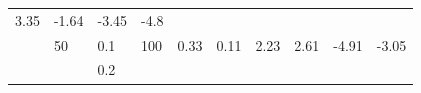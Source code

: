 \documentclass[12pt,oneside,a4paper]{reedthesis}
\begin{document}
\begin{longtable}[]{@{}llllllllll@{}}
\begin{minipage}[t]{0.07\columnwidth}
3.35\strut
\end{minipage} & \begin{minipage}[t]{0.07\columnwidth}\raggedright
-1.64\strut
\end{minipage} & \begin{minipage}[t]{0.09\columnwidth}\raggedright
-3.45\strut
\end{minipage} & \begin{minipage}[t]{0.09\columnwidth}\raggedright
-4.8\strut
\end{minipage}\tabularnewline
\begin{minipage}[t]{0.11\columnwidth}\raggedright
\strut
\end{minipage} & \begin{minipage}[t]{0.05\columnwidth}\raggedright
50\strut
\end{minipage} & \begin{minipage}[t]{0.05\columnwidth}\raggedright
0.1\strut
\end{minipage} & \begin{minipage}[t]{0.05\columnwidth}\raggedright
100\strut
\end{minipage} & \begin{minipage}[t]{0.07\columnwidth}\raggedright
0.33\strut
\end{minipage} & \begin{minipage}[t]{0.07\columnwidth}\raggedright
0.11\strut
\end{minipage} & \begin{minipage}[t]{0.07\columnwidth}\raggedright
2.23\strut
\end{minipage} & \begin{minipage}[t]{0.07\columnwidth}\raggedright
2.61\strut
\end{minipage} & \begin{minipage}[t]{0.09\columnwidth}\raggedright
-4.91\strut
\end{minipage} & \begin{minipage}[t]{0.09\columnwidth}\raggedright
-3.05\strut
\end{minipage}\tabularnewline
\begin{minipage}[t]{0.11\columnwidth}\raggedright
\strut
\end{minipage} & \begin{minipage}[t]{0.05\columnwidth}\raggedright
\strut
\end{minipage} & \begin{minipage}[t]{0.05\columnwidth}\raggedright
0.2\strut
\end{minipage} & \begin{minipage}[t]{0.05\columnwidth}\raggedright

\end{minipage}
\end{longtable}
\end{document}
